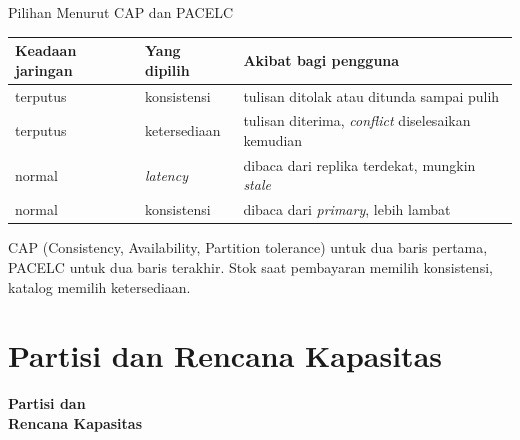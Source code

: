 \documentclass[aspectratio=169, table, 12pt]{beamer}
\begin{document}
\begin{frame}{{\Large Pilihan Menurut CAP dan PACELC}}
  \vspace{6pt}
  \centering
  {\footnotesize
  \begin{tabularx}{\textwidth}{llY}
    \hline
    \textbf{Keadaan jaringan} & \textbf{Yang dipilih} & \textbf{Akibat bagi pengguna} \\
    \hline
    terputus & konsistensi & tulisan ditolak atau ditunda sampai pulih \\
    \hline
    terputus & ketersediaan & tulisan diterima, \textit{conflict} diselesaikan kemudian \\
    \hline
    normal & \textit{latency} & dibaca dari replika terdekat, mungkin \textit{stale} \\
    \hline
    normal & konsistensi & dibaca dari \textit{primary}, lebih lambat \\
    \hline
  \end{tabularx}}

  \vspace{6pt}
  {\small CAP (Consistency, Availability, Partition tolerance) untuk dua baris
  pertama, PACELC untuk dua baris terakhir. Stok saat pembayaran memilih
  konsistensi, katalog memilih ketersediaan.}
\end{frame}

\section{Partisi dan Rencana Kapasitas}

\begin{frame}{\hfill}
  \centering
  \Huge{\textbf{Partisi dan\\Rencana Kapasitas}}
\end{frame}
\end{document}
